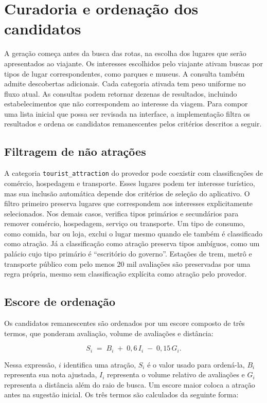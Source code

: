 \section{Curadoria e ordenação dos candidatos}
\label{sec:curadoria}

A geração começa antes da busca das rotas, na escolha dos lugares que serão apresentados ao viajante. Os interesses escolhidos pelo viajante ativam buscas por tipos de lugar correspondentes, como parques e museus. A consulta também admite descobertas adicionais. Cada categoria ativada tem peso uniforme no fluxo atual. As consultas podem retornar dezenas de resultados, incluindo estabelecimentos que não correspondem ao interesse da viagem. Para compor uma lista inicial que possa ser revisada na interface, a implementação filtra os resultados e ordena os candidatos remanescentes pelos critérios descritos a seguir.

\subsection{Filtragem de não atrações}
A categoria \texttt{tourist\_attraction} do provedor pode coexistir com classificações de comércio, hospedagem e transporte. Esses lugares podem ter interesse turístico, mas sua inclusão automática depende dos critérios de seleção do aplicativo. O filtro primeiro preserva lugares que correspondem aos interesses explicitamente selecionados. Nos demais casos, verifica tipos primários e secundários para remover comércio, hospedagem, serviço ou transporte. Um tipo de consumo, como comida, bar ou loja, exclui o lugar mesmo quando ele também é classificado como atração. Já a classificação como atração preserva tipos ambíguos, como um palácio cujo tipo primário é ``escritório do governo''. Estações de trem, metrô e transporte público com pelo menos 20 mil avaliações são preservadas por uma regra própria, mesmo sem classificação explícita como atração pelo provedor.

\subsection{Escore de ordenação}
Os candidatos remanescentes são ordenados por um escore composto de três termos, que ponderam avaliação, volume de avaliações e distância:

\[
S_i \;=\; B_i \;+\; 0{,}6\,I_i \;-\; 0{,}15\,G_i .
\]

Nessa expressão, $i$ identifica uma atração, $S_i$ é o valor usado para ordená-la, $B_i$ representa sua nota ajustada, $I_i$ representa o volume relativo de avaliações e $G_i$ representa a distância além do raio de busca. Um escore maior coloca a atração antes na sugestão inicial. Os três termos são calculados da seguinte forma:

